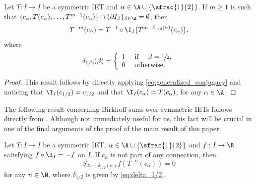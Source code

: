 \begin{lemma}
\label{lem:inverse_iterates}
Let $T: I \to I$ be a symmetric IET and $\alpha \in \A \cup \{\sfrac{1}{2}\}$. If $m \geq 1$ is such that $\{c_\alpha, T(c_\alpha), \ldots, T^{m - 1}(c_\alpha)\} \cap \{\partial I_\beta\}_{\beta \in \A} = \emptyset$, then\vspace*{-3pt}
\begin{equation}
\label{eq:inverse_iterates}
T^{-m}(c_\alpha) =
{T^{-1} \circ \I_I} \big( T^{m - \delta_{1/2}(\alpha)}(c_\alpha) \big),
\end{equation}
where\vspace*{-3pt}
\begin{equation}
\label{eq:delta_1/2}
\delta_{1/2}(\beta) = \left\{\begin{array}{ll} 1 & \text{ if } \quad \beta = \sfrac{1}{2}, \\
0 & \text{ otherwise}.
\end{array} \right.
\end{equation}
\end{lemma}

\begin{proof}
This result follows by directly applying \eqref{eq:generalized_conjugacy} and noticing that $\I_I(c_{1/2}) = c_{1/2}$ and that $\I_I(c_\alpha) = T(c_\alpha)$, for any $\alpha \in \A$.
\end{proof}

The following result concerning Birkhoff sums over symmetric IETs follows
directly from \cite[Lem.\,3.11]{berk_ergodicity_2023}. Although not
immediately useful for us, this fact will be crucial in one of the final
arguments of the proof of the main result of this paper.
\begin{lemma}\label{lem: berktrujillo}
Let $T: I \to I$ be a symmetric IET, $\alpha \in \A \cup\{\sfrac{1}{2}\}$ and $f : I\to \R$ satisfying $f\circ \I_I=-f$ on $\mathring I$. If $c_{\alpha}$ is not part of any connection, then\vspace*{-3pt}
\[
S_{2n + \delta_{1/2}(\alpha)}f(T^{-n}(c_{\alpha})) = 0
\]
for any $n\in\N$, where $\delta_{1/2}$ is given by \eqref{eq:delta_1/2}.
\end{lemma}

